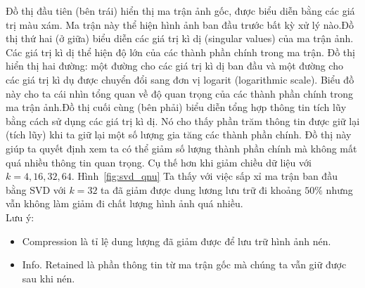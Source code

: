 \documentclass[12pt,a4paper,oneside]{report}
\numberwithin{equation}{section}
\begin{document}
Đồ thị đầu tiên (bên trái) hiển thị ma trận ảnh gốc, được biểu diễn bằng các giá trị màu xám. Ma trận này thể hiện hình ảnh ban đầu trước bất kỳ xử lý nào.Đồ thị thứ hai (ở giữa) biểu diễn các giá trị kì dị (singular values) của ma trận ảnh. Các giá trị kì dị thể hiện độ lớn của các thành phần chính trong ma trận. Đồ thị hiển thị hai đường: một đường cho các giá trị kì dị ban đầu và một đường cho các giá trị kì dụ được chuyển đổi sang đơn vị logarit (logarithmic scale). Biểu đồ này cho ta cái nhìn tổng quan về độ quan trọng của các thành phần chính trong ma trận ảnh.Đồ thị cuối cùng (bên phải) biểu diễn tổng hợp thông tin tích lũy bằng cách sử dụng các giá trị kì dị. Nó cho thấy phần trăm thông tin được giữ lại (tích lũy) khi ta giữ lại một số lượng gia tăng các thành phần chính. Đồ thị này giúp ta quyết định xem ta có thể giảm số lượng thành phần chính mà không mất quá nhiều thông tin quan trọng.
Cụ thế hơn khi giảm chiều dữ liệu với $k = 4,16, 32 ,64.$ Hình~\ref{fig:svd_qnu} Ta thấy với việc sấp xỉ ma trận ban đầu bằng SVD với $ k=32 $ ta đã giảm được dung lương lưu trữ đi khoảng $50\%$ nhưng vẫn không làm giảm đi chất lượng hình ảnh quá nhiều.\\
Lưu ý: 
\begin{itemize}
	\item Compression là tỉ lệ dung lượng đã giảm được để lưu trữ hình ảnh nén.
	\item Info. Retained là phần thông tin từ ma trận gốc mà chúng ta vẫn giữ được sau khi nén.
\end{itemize}
\end{document}
